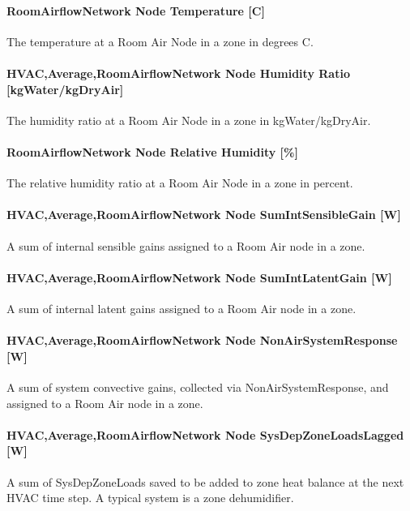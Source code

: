 \paragraph{RoomAirflowNetwork Node Temperature {[}C{]}}\label{roomairflownetwork-node-temperature-c-000}

The temperature at a Room Air Node in a zone in degrees C.

\paragraph{HVAC,Average,RoomAirflowNetwork Node Humidity Ratio {[}kgWater/kgDryAir{]}}\label{hvacaverageroomairflownetwork-node-humidity-ratio-kgwaterkgdryair}

The humidity ratio at a Room Air Node in a zone in kgWater/kgDryAir.

\paragraph{RoomAirflowNetwork Node Relative Humidity {[}\%{]}}\label{roomairflownetwork-node-relative-humidity}

The relative humidity ratio at a Room Air Node in a zone in percent.

\paragraph{HVAC,Average,RoomAirflowNetwork Node SumIntSensibleGain {[}W{]}}\label{hvacaverageroomairflownetwork-node-sumintsensiblegain-w}

A sum of internal sensible gains assigned to a Room Air node in a zone.

\paragraph{HVAC,Average,RoomAirflowNetwork Node SumIntLatentGain {[}W{]}}\label{hvacaverageroomairflownetwork-node-sumintlatentgain-w}

A sum of internal latent gains assigned to a Room Air node in a zone.

\paragraph{HVAC,Average,RoomAirflowNetwork Node NonAirSystemResponse {[}W{]}}\label{hvacaverageroomairflownetwork-node-nonairsystemresponse-w}

A sum of system convective gains, collected via NonAirSystemResponse, and assigned to a Room Air node in a zone.

\paragraph{HVAC,Average,RoomAirflowNetwork Node SysDepZoneLoadsLagged {[}W{]}}\label{hvacaverageroomairflownetwork-node-sysdepzoneloadslagged-w}

A sum of SysDepZoneLoads saved to be added to zone heat balance at the next HVAC time step. A typical system is a zone dehumidifier.
